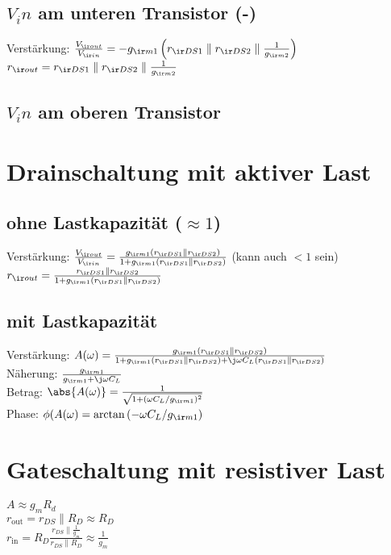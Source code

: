 \documentclass[european]{latex4ei_sheet}
\begin{document}
	\subsection{$V_in$ am unteren Transistor (-)}
	Verstärkung: $\frac{V_{\ir out}}{V_{\ir in}} = -g_{\ir m1}\left( r_{\ir DS1}\parallel r_{\ir DS2}\parallel \frac{1}{g_{\ir m2}}\right)$\\
	$r_{\ir out} = r_{\ir DS1}\parallel r_{\ir DS2}\parallel \frac{1}{g_{\ir m2}}$
	\subsection{$V_in$ am oberen Transistor}

\section{Drainschaltung mit aktiver Last}
	\subsection{ohne Lastkapazität ($\approx 1$)}
	Verstärkung: $\frac{V_{\ir out}}{V_{\ir in}} = \frac{g_{\ir m1}(r_{\ir DS1}\parallel r_{\ir DS2})}{1 + g_{\ir m1}(r_{\ir DS1}\parallel r_{\ir DS2})}$ (kann auch $<1$ sein)\\
	$r_{\ir out} = \frac{r_{\ir DS1}\parallel r_{\ir DS2}}{1 + g_{\ir m1}(r_{\ir DS1}\parallel r_{\ir DS2})}$
	\subsection{mit Lastkapazität}
	Verstärkung: $A(\omega) = \frac{g_{\ir m1}(r_{\ir DS1}\parallel r_{\ir DS2})}{1 + g_{\ir m1}(r_{\ir DS1}\parallel r_{\ir DS2})+\j\omega C_L(r_{\ir DS1}\parallel r_{\ir DS2})}$\\
	Näherung: $\frac{g_{\ir m1}}{g_{\ir m1}+\j\omega C_L}$\\
	Betrag: $\abs{A(\omega)} = \frac{1}{\sqrt{1+(\omega C_L / g_{\ir m1})^2}}$\\
	Phase: $\phi(A(\omega) = \arctan{(-\omega C_L / g_{\ir m1})}$\\

\section{Gateschaltung mit resistiver Last}
$A \approx g_mR_d$\\
$r_\text{out} = r_{DS} \parallel R_D \approx R_D$\\
$r_\text{in} = R_D\frac{r_{DS}\parallel \frac{1}{g_m}}{r_{DS}\parallel R_D}\approx \frac{1}{g_m}$
\end{document}
